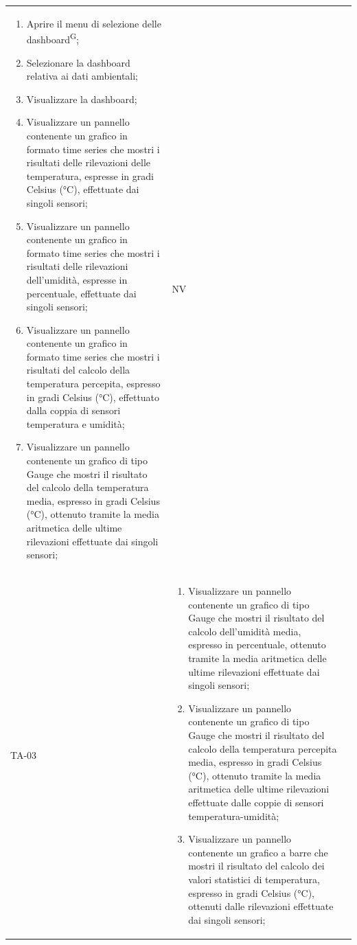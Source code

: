 \documentclass[8pt]{article}
\newcommand{\glossterm}[1]{#1\textsuperscript{G}} %
\begin{document}
\begin{longtable}{|>{\centering}p{2cm}|>{\RaggedRight}m{12cm}|>{\centering\arraybackslash}p{2cm}|}
\begin{enumerate}
        \item Aprire il menu di selezione delle \glossterm{dashboard};
        \item Selezionare la dashboard relativa ai dati ambientali;
        \item Visualizzare la dashboard;
        \item Visualizzare un pannello contenente un grafico in formato time series che mostri i
            risultati delle rilevazioni delle temperatura, espresse in gradi Celsius (°C),
            effettuate dai singoli sensori;
        \item Visualizzare un pannello contenente un grafico in formato time series che mostri i
            risultati delle rilevazioni dell’umidità, espresse in percentuale, effettuate dai
            singoli sensori;
        \item Visualizzare un pannello contenente un grafico in formato time series che mostri i
            risultati del calcolo della temperatura percepita, espresso in gradi Celsius (°C),
            effettuato dalla coppia di sensori temperatura e umidità;
        \item Visualizzare un pannello contenente un grafico di tipo Gauge che mostri il risultato
            del calcolo della temperatura media, espresso in gradi Celsius (°C), ottenuto tramite la
            media aritmetica delle ultime rilevazioni effettuate dai singoli sensori;
        \end{enumerate}
        & NV \\
        TA-03 &
        \begin{enumerate}[start=8]
        \item Visualizzare un pannello contenente un grafico di tipo Gauge che mostri il risultato
            del calcolo dell'umidità media, espresso in percentuale, ottenuto tramite la
            media aritmetica delle ultime rilevazioni effettuate dai singoli sensori;
        \item Visualizzare un pannello contenente un grafico di tipo Gauge che mostri il risultato
            del calcolo della temperatura percepita media, espresso in gradi Celsius (°C), ottenuto tramite la
            media aritmetica delle ultime rilevazioni effettuate dalle coppie di sensori temperatura-umidità;
        \item Visualizzare un pannello contenente un grafico a barre che mostri il risultato
            del calcolo dei valori statistici di temperatura, espresso in gradi Celsius (°C), ottenuti dalle rilevazioni effettuate dai singoli sensori;

\end{enumerate}
\end{longtable}
\end{document}
